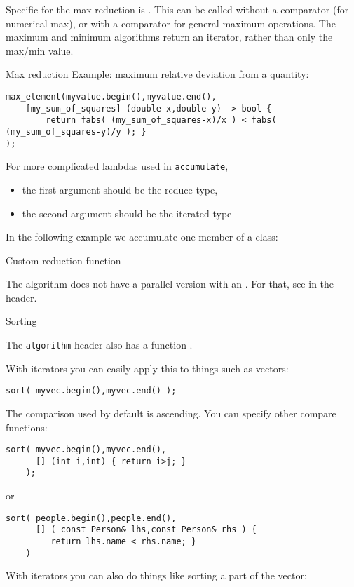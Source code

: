 Specific for the max reduction is .
This can be called without a comparator (for numerical max),
or with a comparator for general maximum operations.
The maximum and minimum algorithms return an iterator,
rather than only the max/min value.

\begin{block}{Max reduction}
  Example: maximum relative deviation from a quantity:
\begin{lstlisting}
max_element(myvalue.begin(),myvalue.end(),
    [my_sum_of_squares] (double x,double y) -> bool {
        return fabs( (my_sum_of_squares-x)/x ) < fabs( (my_sum_of_squares-y)/y ); }
);
\end{lstlisting}
\end{block}

For more complicated lambdas used in \lstinline{accumulate},
\begin{itemize}
\item the first argument should be the reduce type,
\item the second argument should be the iterated type
\end{itemize}
In the following example we accumulate one member
of a class:

\begin{block}{Custom reduction function}
  \label{sl:reduce-icomp}
  \begin{multicols}{2}
    \columnbreak
  \end{multicols}
\end{block}

\begin{remark}
  The  algorithm does not have a parallel version
  with an .
  For that, see  in the  header.
\end{remark}

 {Sorting}
\label{sec:stl:sort}

The \lstinline{algorithm} header also has a function .

With iterators you can easily apply this to things such as vectors:
\begin{lstlisting}
sort( myvec.begin(),myvec.end() );
\end{lstlisting}
The comparison used by default is ascending.
You can specify other compare functions:
\begin{lstlisting}
sort( myvec.begin(),myvec.end(),
      [] (int i,int) { return i>j; }
    );
\end{lstlisting}
or
\begin{lstlisting}
sort( people.begin(),people.end(),
      [] ( const Person& lhs,const Person& rhs ) {
         return lhs.name < rhs.name; }
    )
\end{lstlisting}
With iterators you can also do things like sorting a part of the vector:

